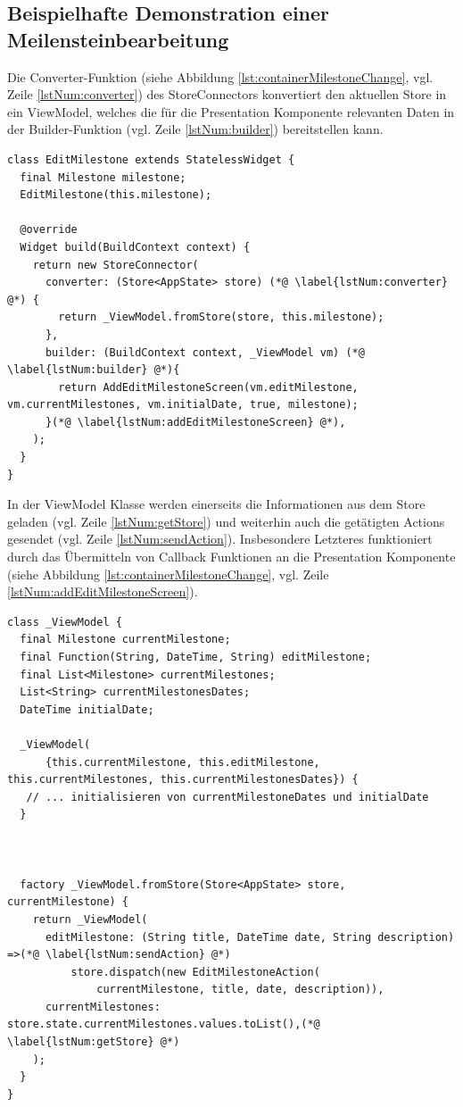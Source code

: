 \documentclass[bibliography=totoc,listof=totoc,BCOR=5mm,DIV=12,oneside]{scrbook}
\begin{document}
\subsection{Beispielhafte Demonstration einer Meilensteinbearbeitung}

\par Die Converter-Funktion (siehe Abbildung \ref{lst:containerMilestoneChange}, vgl. Zeile \ref{lstNum:converter}) des StoreConnectors konvertiert den aktuellen Store in ein ViewModel, welches die für die Presentation Komponente relevanten Daten in der Builder-Funktion (vgl. Zeile \ref{lstNum:builder}) bereitstellen kann.

\bigskip
\begin{lstlisting}[caption={Container Komponente einer Meilensteinänderung},captionpos=b, label=lst:containerMilestoneChange]
class EditMilestone extends StatelessWidget {
  final Milestone milestone;
  EditMilestone(this.milestone);

  @override
  Widget build(BuildContext context) {
    return new StoreConnector(
      converter: (Store<AppState> store) (*@ \label{lstNum:converter} @*) {
        return _ViewModel.fromStore(store, this.milestone);
      },
      builder: (BuildContext context, _ViewModel vm) (*@ \label{lstNum:builder} @*){
        return AddEditMilestoneScreen(vm.editMilestone, vm.currentMilestones, vm.initialDate, true, milestone);
      }(*@ \label{lstNum:addEditMilestoneScreen} @*),
    );
  }
}
\end{lstlisting}
\bigskip

\par In der ViewModel Klasse werden einerseits die Informationen aus dem Store geladen (vgl. Zeile \ref{lstNum:getStore}) und weiterhin auch die getätigten Actions gesendet (vgl. Zeile \ref{lstNum:sendAction}). Insbesondere Letzteres funktioniert durch das Übermitteln von Callback Funktionen an die Presentation Komponente (siehe Abbildung \ref{lst:containerMilestoneChange}, vgl. Zeile \ref{lstNum:addEditMilestoneScreen}).

\newpage
\bigskip
\begin{lstlisting}[caption={ViewModel von Container Komponente einer Meilensteinänderung},captionpos=b, label=lst:containerMilestoneChangeViewModel]
class _ViewModel {
  final Milestone currentMilestone;
  final Function(String, DateTime, String) editMilestone;
  final List<Milestone> currentMilestones;
  List<String> currentMilestonesDates;
  DateTime initialDate;

  _ViewModel(
      {this.currentMilestone, this.editMilestone, this.currentMilestones, this.currentMilestonesDates}) {
   // ... initialisieren von currentMilestoneDates und initialDate
  }

  
  
  factory _ViewModel.fromStore(Store<AppState> store, currentMilestone) {
    return _ViewModel(
      editMilestone: (String title, DateTime date, String description) =>(*@ \label{lstNum:sendAction} @*)
          store.dispatch(new EditMilestoneAction(
              currentMilestone, title, date, description)),
      currentMilestones: store.state.currentMilestones.values.toList(),(*@ \label{lstNum:getStore} @*)
    );
  }
}
\end{lstlisting}
\bigskip
\end{document}

